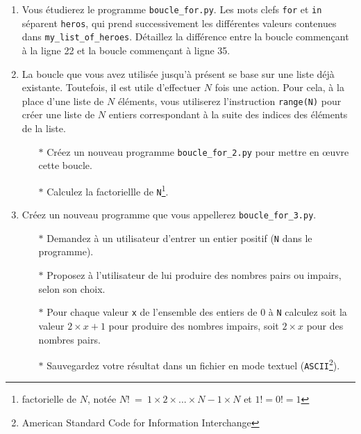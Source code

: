 \begin{enumerate}
\item Vous  étudierez le programme \texttt{boucle\_for.py}.   Les mots
  clefs \texttt{for} et \texttt{in} séparent \texttt{heros}, qui prend
  successivement    les    différentes    valeurs    contenues    dans
  \texttt{my\_list\_of\_heroes}.  Détaillez la  différence entre la
  boucle commençant à la ligne 22 et la boucle commençant à ligne 35.

\item La boucle que vous avez  utilisée jusqu'à présent se base sur une
  liste déjà existante.  Toutefois,  il est utile d'effectuer $N$
  fois une  action. Pour cela, à  la place d'une liste  de $N$
  éléments, vous utiliserez  l'instruction \texttt{range(N)} pour créer
  une liste de $N$ entiers correspondant à la suite des indices des éléments
  de la liste.
  \begin{itemize}
  \item[$\ast$]  Créez un  nouveau  programme \texttt{boucle\_for\_2.py}  pour
    mettre en \oe{}uvre cette boucle.
  \item[$\ast$] Calculez la factoriellle de \texttt{N}\footnote{factorielle de
    $N$, notée $N!$~=~$1 \times 2 \times... \times N-1 \times N$ et $1! = 0! = 1$}.
  \end{itemize}



\item    Créez   un    nouveau   programme    que   vous    appellerez
  \texttt{boucle\_for\_3.py}.
  \begin{itemize}
  \item[$\ast$]  Demandez   à  un  utilisateur  d'entrer   un  entier  positif
    (\texttt{N} dans le programme).
  \item[$\ast$]  Proposez à  l'utilisateur de lui  produire des  nombres pairs  ou
    impairs, selon son choix.
  \item[$\ast$] Pour chaque valeur \texttt{x} de l'ensemble des entiers de 0
    à \texttt{N} calculez soit la  valeur $2\times x+1$ pour produire
    des nombres impairs, soit $2\times x$ pour des nombres pairs.
  \item[$\ast$]    Sauvegardez     votre    résultat    dans     un    fichier
    en mode textuel (\texttt{ASCII}\footnote{American  Standard  Code  for  Information
      Interchange}).
  \end{itemize}

\end{enumerate}




